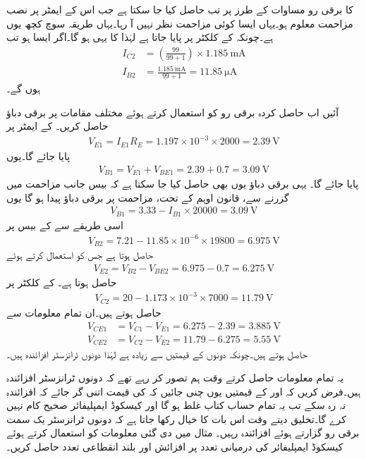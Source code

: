  کا برقی رو مساوات  کے طرز پر تب حاصل کیا جا سکتا ہے جب اس کے ایمٹر پر نصب مزاحمت معلوم ہو۔یہاں ایسا کوئی مزاحمت نظر نہیں آ رہا۔یہاں طریقہ سوچ کچھ یوں ہے۔چونکہ  کے کلکٹر  پر  پایا جاتا ہے لہٰذا  کا  یہی ہو گا۔اگر ایسا ہو تب
\begin{align*}
I_{C2}&=\left(\frac{99}{99+1}\right) \times \SI{1.185}{\milli \ampere}\\
I_{B2}&=\frac{\SI{1.185}{\milli \ampere}}{99+1}=\SI{11.85}{\micro \ampere}
\end{align*} 
ہوں گے۔

آئیں اب حاصل کردہ برقی رو کو استعمال کرتے ہوئے مختلف مقامات پر برقی دباؤ حاصل کریں۔ کے ایمٹر پر
\begin{align*}
V_{E1}=I_{E1} R_E=1.197 \times 10^{-3} \times 2000=\SI{2.39}{\volt}
\end{align*}
پایا جائے گا۔یوں
\begin{align*}
V_{B1}=V_{E1}+V_{BE1}=2.39+0.7=\SI{3.09}{\volt}
\end{align*}
پایا جائے گا۔ یہی برقی دباؤ یوں بھی حاصل کیا جا سکتا ہے کہ بیس  جانب  مزاحمت میں  گزرنے سے،   قانون اوہم  کے تحت، مزاحمت پر  برقی دباؤ پیدا ہو گا یوں
\begin{align*}
V_{B1}=3.33-I_{B1} \times 20000=\SI{3.09}{\volt}
\end{align*}
اسی طریقے سے   کے بیس  پر
\begin{align*}
V_{B2}=7.21 -11.85 \times 10^{-6} \times 19800=\SI{6.975}{\volt} 
\end{align*}
حاصل ہوتا ہے جس کو استعمال کرتے ہوئے
\begin{align*}
V_{E2}=V_{B2}-V_{BE2}=6.975-0.7=\SI{6.275}{\volt}
\end{align*}
حاصل ہوتا ہے۔ کے کلکٹر  پر
\begin{align*}
V_{C2}=20 -1.173 \times 10^{-3} \times 7000=\SI{11.79}{\volt}
\end{align*}
حاصل ہوتے ہیں۔ان تمام معلومات سے
\begin{align*}
V_{CE1}&=V_{C1}-V_{E1}=6.275-2.39=\SI{3.885}{\volt}\\
V_{CE2}&=V_{C2}-V_{E2}=11.79-6.275=\SI{5.55}{\volt}
\end{align*}
حاصل ہوتے ہیں۔چونکہ دونوں  کے قیمتیں  سے زیادہ ہے لہٰذا دونوں ٹرانزسٹر افزائندہ ہیں۔

یہ تمام معلومات حاصل کرتے وقت ہم تصور کر رہے تھے کہ دونوں ٹرانزسٹر افزائندہ ہیں۔فرض کریں کہ  اور  کے قیمتیں یوں چنی جائیں کہ  کی قیمت اتنی گر جائے کہ  افزائندہ نہ رہ سکے تب یہ تمام حساب کتاب غلط ہو گا اور کیسکوڈ ایمپلیفائر صحیح کام نہیں کرے گا۔تخلیق دیتے وقت اس بات کا خیال رکھا جاتا ہے کہ دونوں ٹرانزسٹر یک سمت  برقی رو گزارتے ہوئے افزائندہ رہیں۔
مثال  میں دی گئی معلومات کو استعمال کرتے ہوئے کیسکوڈ ایمپلیفائر کی درمیانی تعدد پر افزائش  اور بلند انقطاعی تعدد  حاصل کریں۔

